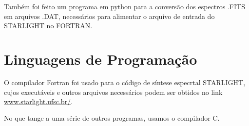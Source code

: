Também foi feito um programa em python para a conversão dos espectros .FITS em arquivos .DAT, necessários para alimentar o arquivo de entrada do STARLIGHT no FORTRAN.

\section{Linguagens de Programação}

O compilador Fortran foi usado para o código de síntese especrtal STARLIGHT, cujos executáveis e outros arquivos necessários podem ser obtidos no link \url{www.starlight.ufsc.br/}.

No que tange a uma série de outros programas, usamos o compilador C.